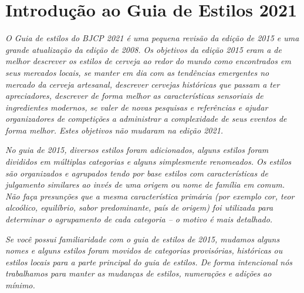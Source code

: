 \section*{Introdução ao Guia de Estilos 2021}
\textit{O Guia de estilos do BJCP 2021 é uma pequena revisão da edição de 2015 e uma grande atualização da edição de 2008. Os objetivos da edição 2015 eram a de melhor descrever os estilos de cerveja ao redor do mundo como encontrados em seus mercados locais, se manter em dia com as tendências emergentes no mercado da cerveja artesanal, descrever cervejas históricas que passam a ter apreciadores, descrever de forma melhor as características sensoriais de ingredientes modernos, se valer de novas pesquisas e referências e ajudar organizadores de competições a administrar a complexidade de seus eventos de forma melhor. Estes objetivos não mudaram na edição 2021.}

\textit{No guia de 2015, diversos estilos foram adicionados, alguns estilos foram divididos em múltiplas categorias e alguns simplesmente renomeados. Os estilos são organizados e agrupados tendo por base estilos com características de julgamento similares ao invés de uma origem ou nome de família em comum. Não faça presunções que a mesma característica primária (por exemplo cor, teor alcoólico, equilíbrio, sabor predominante, país de origem) foi utilizada para determinar o agrupamento de cada categoria – o motivo é mais detalhado.}

\textit{Se você possui familiaridade com o guia de estilos de 2015, mudamos alguns nomes e alguns estilos foram movidos de categorias provisórias, históricas ou estilos locais para a parte principal do guia de estilos. De forma intencional nós trabalhamos para manter as mudanças de estilos, numerações e adições ao mínimo.}